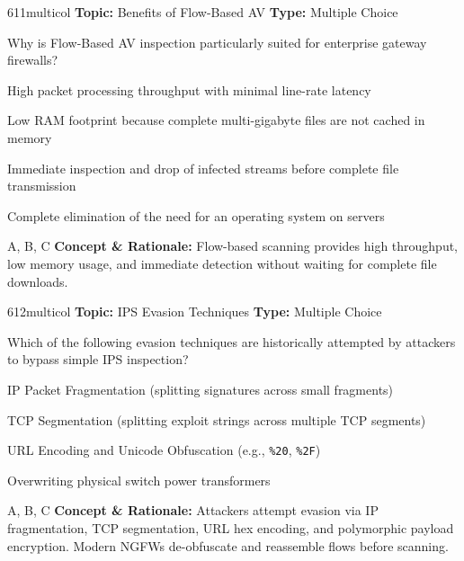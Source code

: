 \begin{qcard}{611}{multicol}
\textcolor{darkslate!75}{\small\textbf{Topic:} Benefits of Flow-Based AV \hfill \textbf{Type:} Multiple Choice}\vspace{0.4em}\par
Why is Flow-Based AV inspection particularly suited for enterprise gateway firewalls?
\begin{qoptions}
\item High packet processing throughput with minimal line-rate latency
\item Low RAM footprint because complete multi-gigabyte files are not cached in memory
\item Immediate inspection and drop of infected streams before complete file transmission
\item Complete elimination of the need for an operating system on servers
\end{qoptions}
\end{qcard}
\nopagebreak
\begin{explainbox}{A, B, C}
\textbf{Concept \& Rationale:} Flow-based scanning provides high throughput, low memory usage, and immediate detection without waiting for complete file downloads.
\end{explainbox}

\begin{qcard}{612}{multicol}
\textcolor{darkslate!75}{\small\textbf{Topic:} IPS Evasion Techniques \hfill \textbf{Type:} Multiple Choice}\vspace{0.4em}\par
Which of the following evasion techniques are historically attempted by attackers to bypass simple IPS inspection?
\begin{qoptions}
\item IP Packet Fragmentation (splitting signatures across small fragments)
\item TCP Segmentation (splitting exploit strings across multiple TCP segments)
\item URL Encoding and Unicode Obfuscation (e.g., \texttt{\%20}, \texttt{\%2F})
\item Overwriting physical switch power transformers
\end{qoptions}
\end{qcard}
\nopagebreak
\begin{explainbox}{A, B, C}
\textbf{Concept \& Rationale:} Attackers attempt evasion via IP fragmentation, TCP segmentation, URL hex encoding, and polymorphic payload encryption. Modern NGFWs de-obfuscate and reassemble flows before scanning.
\end{explainbox}

